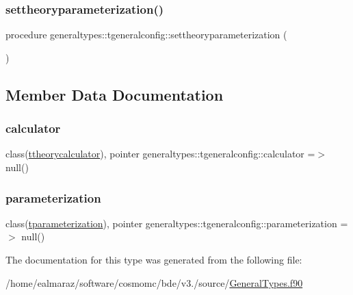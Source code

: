 \subsubsection{\texorpdfstring{settheoryparameterization()}{settheoryparameterization()}}
{\footnotesize\ttfamily procedure generaltypes\+::tgeneralconfig\+::settheoryparameterization (\begin{DoxyParamCaption}{ }\end{DoxyParamCaption})\hspace{0.3cm}{\ttfamily [private]}}



\subsection{Member Data Documentation}
\mbox{\label{structgeneraltypes_1_1tgeneralconfig_a6510b28d396a0023fee064c386457f81}} 
\subsubsection{\texorpdfstring{calculator}{calculator}}
{\footnotesize\ttfamily class(\mbox{\hyperlink{structgeneraltypes_1_1ttheorycalculator}{ttheorycalculator}}), pointer generaltypes\+::tgeneralconfig\+::calculator =$>$ null()\hspace{0.3cm}{\ttfamily [private]}}

\mbox{\label{structgeneraltypes_1_1tgeneralconfig_ac874e0a61802f5a8c144aa7318ec4c41}} 
\subsubsection{\texorpdfstring{parameterization}{parameterization}}
{\footnotesize\ttfamily class(\mbox{\hyperlink{structgeneraltypes_1_1tparameterization}{tparameterization}}), pointer generaltypes\+::tgeneralconfig\+::parameterization =$>$ null()\hspace{0.3cm}{\ttfamily [private]}}



The documentation for this type was generated from the following file\+:\begin{DoxyCompactItemize}
\item 
/home/ealmaraz/software/cosmomc/bde/v3./source/\mbox{\hyperlink{GeneralTypes_8f90}{General\+Types.\+f90}}\end{DoxyCompactItemize}
